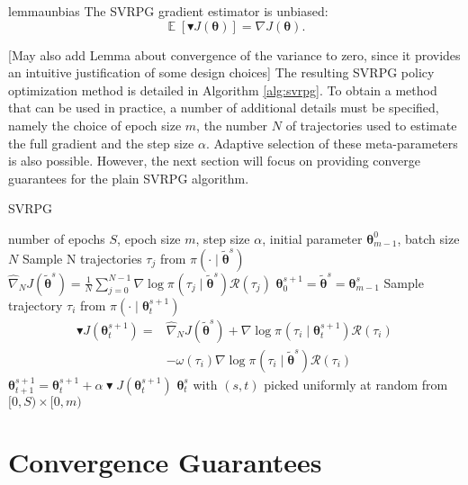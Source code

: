\documentclass{article}
\theoremstyle{remark}
\theoremstyle{definition}
\newcommand{\vtheta}{\boldsymbol{\theta}}
\newcommand{\Reward}{\mathcal{R}}
\newcommand{\score}[2]{\nabla\log\pi_{#1}(#2)}
\newcommand{\gradJ}[1]{\nabla J(#1)}
\newcommand{\gradApp}[2]{\hat{\nabla}_{#2}J(#1)}
\begin{document}
\begin{restatable}{lemma}{unbias}\label{lemma:unbias}
The SVRPG gradient estimator is unbiased:
\[
\mathop{\mathbb{E}}
\left[\blacktriangledown J(\vtheta)\right] = \gradJ{\vtheta}.
\]
\end{restatable}

[May also add Lemma about convergence of the variance to zero, since it provides an intuitive justification of some design choices]
The resulting SVRPG policy optimization method is detailed in Algorithm \ref{alg:svrpg}.
To obtain a method that can be used in practice, a number of additional details must be specified, namely the choice of epoch size $m$, the number $N$ of trajectories used to estimate the full gradient and the step size $\alpha$. Adaptive selection of these meta-parameters is also possible. However, the next section will focus on providing converge guarantees for the plain SVRPG algorithm.

\begin{algorithm}[tb]
	\caption{SVRPG}
	\label{alg:svrpg}
	\begin{algorithmic}
		 number of epochs $S$, epoch size $m$, step size $\alpha$, initial parameter $\vtheta_{m-1}^0$, batch size $N$
		\STATE Sample N trajectories $\tau_j$ from $\pi(\cdot\mid\tilde{\vtheta}^{s})$
		\STATE $\gradApp{\tilde{\vtheta}^{s}}{N} = \frac{1}{N}\sum_{j=0}^{N-1}\score{}{\tau_j\mid\tilde{\vtheta}^{s}}\Reward(\tau_j)$
		\STATE $\vtheta_0^{s+1} = \tilde{\vtheta}^s = \vtheta_{m-1}^s$
		\STATE Sample trajectory $\tau_i$ from 				$\pi(\cdot\mid\vtheta_t^{s+1})$
		\STATE 
		\begin{align*}
		\blacktriangledown J(\vtheta_t^{s+1}) = 
		&\gradApp{\tilde{\vtheta}^s}{N}
		+ \score{}{\tau_i\mid\vtheta_t^{s+1}}\Reward(\tau_i) \\
		& - \omega(\tau_i)\score{}{\tau_i \mid \tilde{\vtheta}^{s}}\Reward(\tau_i)
		\end{align*}
		\STATE $\vtheta_{t+1}^{s+1} = \vtheta_t^{s+1} + \alpha\blacktriangledown J(\vtheta_t^{s+1})$
		\ENDFOR
		\ENDFOR
		 $\vtheta_t^s$ with $(s,t)$ picked uniformly at random from $[0,S)\times[0,m)$
	\end{algorithmic}
\end{algorithm}

\section{Convergence Guarantees}
\end{document}
